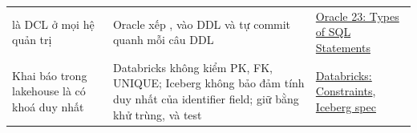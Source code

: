 \begin{xltabular}{\textwidth}{@{}P{3.8cm} L P{3.4cm}@{}}
 là DCL ở mọi hệ quản trị & Oracle xếp ,  vào DDL và tự commit quanh mỗi câu DDL & \href{https://docs.oracle.com/en/database/oracle/oracle-database/23/sqlrf/Types-of-SQL-Statements.html}{Oracle 23: Types of SQL Statements} \\
Khai báo  trong lakehouse là có khoá duy nhất & Databricks không kiểm PK, FK, UNIQUE; Iceberg không bảo đảm tính duy nhất của identifier field; giữ bằng khử trùng,  và test & \href{https://docs.databricks.com/aws/en/tables/constraints}{Databricks: Constraints}, \href{https://iceberg.apache.org/spec/\#identifier-field-ids}{Iceberg spec} \\
\end{xltabular}
